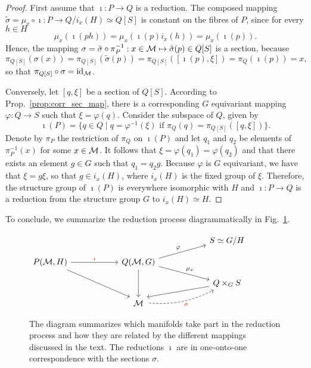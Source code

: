 \documentclass[
final,
11pt,
a4paper,
DIV=11,
headinclude=true,
footinclude=false,
bibliography=totoc,
twoside=true,  %
BCOR=5mm
]{scrbook}
\begin{document}
\begin{proof}
First assume that $\imath : P \to Q$ is a reduction. The composed 
mapping $\tilde{\sigma} = \mu_x \circ \imath : P \to Q/i_x(H) 
\simeq Q[S]$ is constant on the fibres of $P$, since for every $h 
\in H$
\begin{equation*}
  \mu_x(\imath(ph)) = \mu_x(\imath(p) i_x(h))
  = \mu_x(\imath(p)).
\end{equation*}
Hence, the mapping $\sigma = \tilde{\sigma} \circ \pi^{-1}_P 
: x \in \mathcal{M} \mapsto \tilde{\sigma}(p) \in Q[S]$ is a section, 
because
\begin{equation*}
  \pi_{Q[S]}(\sigma(x)) = \pi_{Q[S]}(\tilde{\sigma}(p)) = 
  \pi_{Q[S]}([\imath(p),\xi]) = \pi_Q(\imath(p)) = x,
\end{equation*}
so that $\pi_{Q[S]} \circ \sigma = \mathrm{id}_\mathcal{M}$.

Conversely, let $[q,\xi]$ be a section of $Q[S]$.  According to 
Prop.~\ref{prop:corr_sec_map}, there is a corresponding $G$ 
equivariant mapping $\varphi : Q \to S$ such that $\xi 
= \varphi(q)$. Consider the subspace of $Q$, given by
\begin{equation*}
  \imath(P) = \{ q \in Q \mid q = \varphi^{-1}(\xi) 
  \text{~if~}\pi_Q(q) = \pi_{Q[S]}([q,\xi]) \}.
\end{equation*}
Denote by $\pi_P$ the restriction of $\pi_Q$ on $\imath(P)$ and 
let $q_1$ and $q_2$ be elements of $\pi^{-1}_P(x)$ for some $x 
\in \mathcal{M}$. It follows that $\xi = \varphi(q_1) = \varphi(q_2)$ 
and that there exists an element $g \in G$ such that $q_1 
= q_2g$.  Because $\varphi$ is $G$ equivariant, we have that $\xi 
= g\xi$, so that $g \in i_x(H)$, where $i_x(H)$ is the fixed 
group of $\xi$. Therefore, the structure group of $\imath(P)$ is 
everywhere isomorphic with $H$ and $\imath : P \to Q$ is 
a reduction from the structure group $G$ to $i_x(H) \simeq H$.
\end{proof}

To conclude, we summarize the reduction process diagrammatically 
in Fig.~\ref{fig:diagram_reduction}.
\begin{figure}
\centering
$
\begin{tikzcd}[
  row sep=0.3cm,
  column sep=2cm
  ]
  {}  & & S \simeq G/H
  \\
  P(\mc{M},H)
    \arrow[r, "\imath" color=BrickRed]
    \arrow[ddr, end anchor=north west]
  &  Q(\mc{M},G)
    \arrow[
      ur, "\varphi",
      start anchor={[yshift=-4pt]north east}]
    \arrow[dr, "\mu_x",
      start anchor={[yshift=+4pt]south east}]
    \arrow{dd}
  \\
  {}  & & Q \times_G S
    \arrow[dl, end anchor=north east]
  \\
  {}  & \mc{M}
    \arrow[ur, "\sigma" color=BrickRed,
      dashed, swap,
      bend right=15,
      start anchor={[xshift=+2pt]real east},
      end anchor={[xshift=+5pt]south west}]
\end{tikzcd}
$
\caption{The diagram summarizes which manifolds take part in the 
  reduction process and how they are related by the different 
  mappings discussed in the text. The reductions $\imath$ are in 
  one-onto-one correspondence with the sections $\sigma$.}
\label{fig:diagram_reduction}
\end{figure}
\end{document}
